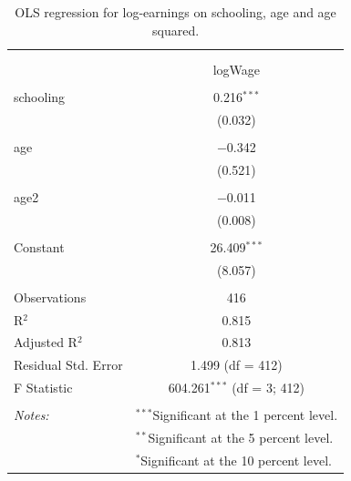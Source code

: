 \documentclass[
]{article}
\begin{document}
\begin{table}[!htbp] \centering 
  \caption{OLS regression for log-earnings on schooling, age and age squared.} 
  \label{tab:q1_a_ols} 
\small 
\begin{tabular}{@{\extracolsep{5pt}}lc} 
\\[-1.8ex]\hline 
\hline \\[-1.8ex] 
\\[-1.8ex] & logWage \\ 
\hline \\[-1.8ex] 
 schooling & 0.216$^{***}$ \\ 
  & (0.032) \\ 
  & \\ 
 age & $-$0.342 \\ 
  & (0.521) \\ 
  & \\ 
 age2 & $-$0.011 \\ 
  & (0.008) \\ 
  & \\ 
 Constant & 26.409$^{***}$ \\ 
  & (8.057) \\ 
  & \\ 
Observations & 416 \\ 
R$^{2}$ & 0.815 \\ 
Adjusted R$^{2}$ & 0.813 \\ 
Residual Std. Error & 1.499 (df = 412) \\ 
F Statistic & 604.261$^{***}$ (df = 3; 412) \\ 
\hline \\[-1.8ex] 
\textit{Notes:} & \multicolumn{1}{l}{$^{***}$Significant at the 1 percent level.} \\ 
 & \multicolumn{1}{l}{$^{**}$Significant at the 5 percent level.} \\ 
 & \multicolumn{1}{l}{$^{*}$Significant at the 10 percent level.} \\ 
\end{tabular} 
\end{table}
\end{document}
